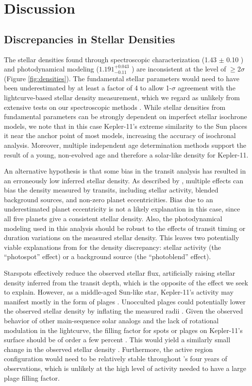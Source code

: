 \documentclass[oneside]{emulateapj}
\begin{document}
\section{Discussion}
\label{s:discussion}
\subsection{Discrepancies in Stellar Densities}

The stellar densities found through spectroscopic characterization (1.43 $\pm$ 0.10 \gcm) and photodynamical modeling ($1.191^{+0.043}_{-0.11} $ \gcm) are inconsistent at the level of $\geq$2$\sigma$ (Figure \ref{fig:densities}). The fundamental stellar parameters would need to have been underestimated by at least a factor of 4 to allow 1-$\sigma$ agreement with the lightcurve-based stellar density measurement, which we regard as unlikely from extensive tests on our spectroscopic methods \citep{Bedell2014,Ramirez2014}. While stellar densities from fundamental parameters can be strongly dependent on imperfect stellar isochrone models, we note that in this case Kepler-11's extreme similarity to the Sun places it near the anchor point of most models, increasing the accuracy of isochronal analysis. Moreover, multiple independent age determination methods support the result of a young, non-evolved age and therefore a solar-like density for Kepler-11.

An alternative hypothesis is that some bias in the transit analysis has resulted in an erroneously low inferred stellar density. As described by \citet{Kipping2014}, multiple effects can bias the density measured by transits, including stellar activity, blended background sources, and non-zero planet eccentricities. Bias due to an underestimated planet eccentricity is not a likely explanation in this case, since all five planets give a consistent stellar density. Also, the photodynamical modeling used in this analysis should be robust to the effects of transit timing or duration variations on the measured stellar density. This leaves two potentially viable explanations from \citet{Kipping2014} for the density discrepancy: stellar activity (the ``photospot'' effect) or a background source (the ``photoblend'' effect).

Starspots effectively reduce the observed stellar flux, artificially raising stellar density inferred from the transit depth, which is the opposite of the effect we seek to explain. However, as a middle-aged Sun-like star, Kepler-11's activity may manifest mostly in the form of plages \citep{Radick1998}. Unocculted plages could potentially lower the observed stellar density by inflating the measured radii \citep{Oshagh2014}. Given the observed behavior of other main-sequence solar analogs and the lack of rotational modulation in the \Kepler lightcurve, the filling factor for spots or plages on Kepler-11's surface should be of order a few percent \citep{Meunier2010}. This would yield a similarly small change in the observed stellar density \citep[O($10^{-2}$),][]{Kipping2014}. Furthermore, the active region configuration would need to be relatively stable throughout \Kepler's four years of observations, which is unlikely at the high level of activity needed to have a large plage filling factor.
\end{document}

